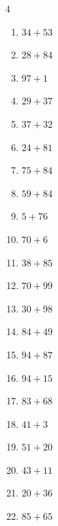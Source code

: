 \begin{multicols}{4}
\begin{enumerate}
  \item $34+53$
        \phantom{$=87$}

  \item $28+84$
        \phantom{$=112$}

  \item $97+1$
        \phantom{$=98$}

  \item $29+37$
        \phantom{$=66$}

  \item $37+32$
        \phantom{$=69$}

  \item $24+81$
        \phantom{$=105$}

  \item $75+84$
        \phantom{$=159$}

  \item $59+84$
        \phantom{$=143$}

  \item $5+76$
        \phantom{$=81$}

  \item $70+6$
        \phantom{$=76$}

  \item $38+85$
        \phantom{$=123$}

  \item $70+99$
        \phantom{$=169$}

  \item $30+98$
        \phantom{$=128$}

  \item $84+49$
        \phantom{$=133$}

  \item $94+87$
        \phantom{$=181$}

  \item $94+15$
        \phantom{$=109$}

  \item $83+68$
        \phantom{$=151$}

  \item $41+3$
        \phantom{$=44$}

  \item $51+20$
        \phantom{$=71$}

  \item $43+11$
        \phantom{$=54$}

  \item $20+36$
        \phantom{$=56$}

  \item $85+65$
        \phantom{$=150$}


\end{enumerate}
\end{multicols}
